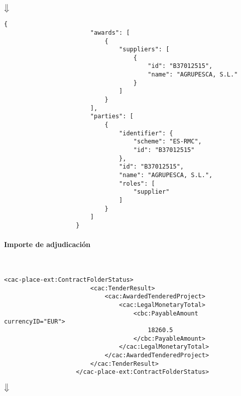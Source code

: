                 \begin{center}
                    $\big\Downarrow$
                \end{center}
                
                \begin{lstlisting}[language=lJSON]
                    {
                        "awards": [
                            {
                                "suppliers": [
                                    {
                                        "id": "B37012515",
                                        "name": "AGRUPESCA, S.L."
                                    }
                                ]
                            }
                        ],
                        "parties": [
                            {
                                "identifier": {
                                    "scheme": "ES-RMC",
                                    "id": "B37012515"
                                },
                                "id": "B37012515",
                                "name": "AGRUPESCA, S.L.",
                                "roles": [
                                    "supplier"
                                ]
                            }
                        ]
                    }
                \end{lstlisting}
                
            \paragraph{Importe de adjudicación} \mbox{}\\
                \begin{lstlisting}[language=lXML]
                    <cac-place-ext:ContractFolderStatus>
                        <cac:TenderResult>
                            <cac:AwardedTenderedProject>
                                <cac:LegalMonetaryTotal>
                                    <cbc:PayableAmount currencyID="EUR">
                                        18260.5
                                    </cbc:PayableAmount>
                                </cac:LegalMonetaryTotal>
                            </cac:AwardedTenderedProject>
                        </cac:TenderResult>
                    </cac-place-ext:ContractFolderStatus>
                \end{lstlisting}
                
                \begin{center}
                    $\big\Downarrow$
                \end{center}
                
